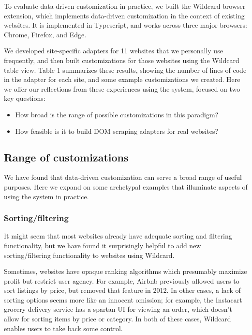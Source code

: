 \documentclass[sigplan,screen,10pt,anonymous,review]{acmart}
\providecommand{\tightlist}{%
  \setlength{\itemsep}{0pt}\setlength{\parskip}{0pt}}
\begin{document}
To evaluate data-driven customization in practice, we built the Wildcard
browser extension, which implements data-driven customization in the
context of existing websites. It is implemented in Typescript, and works
across three major browsers: Chrome, Firefox, and Edge.

We developed site-specific adapters for 11 websites that we personally
use frequently, and then built customizations for those websites using
the Wildcard table view. Table 1 summarizes these results, showing the
number of lines of code in the adapter for each site, and some example
customizations we created. Here we offer our reflections from these
experiences using the system, focused on two key questions:

\begin{itemize}
\tightlist
\item
  How broad is the range of possible customizations in this paradigm?
\item
  How feasible is it to build DOM scraping adapters for real websites?
\end{itemize}

\hypertarget{range-of-customizations}{%
\subsection{Range of customizations}\label{range-of-customizations}}

We have found that data-driven customization can serve a broad range of
useful purposes. Here we expand on some archetypal examples that
illuminate aspects of using the system in practice.

\hypertarget{sortingfiltering}{%
\subsubsection{Sorting/filtering}\label{sortingfiltering}}

It might seem that most websites already have adequate sorting and
filtering functionality, but we have found it surprisingly helpful to
add new sorting/filtering functionality to websites using Wildcard.

Sometimes, websites have opaque ranking algorithms which presumably
maximize profit but restrict user agency. For example, Airbnb previously
allowed users to sort listings by price, but removed that feature in
2012. In other cases, a lack of sorting options seems more like an
innocent omission; for example, the Instacart grocery delivery service
has a spartan UI for viewing an order, which doesn't allow for sorting
items by price or category. In both of these cases, Wildcard enables
users to take back some control.
\end{document}

